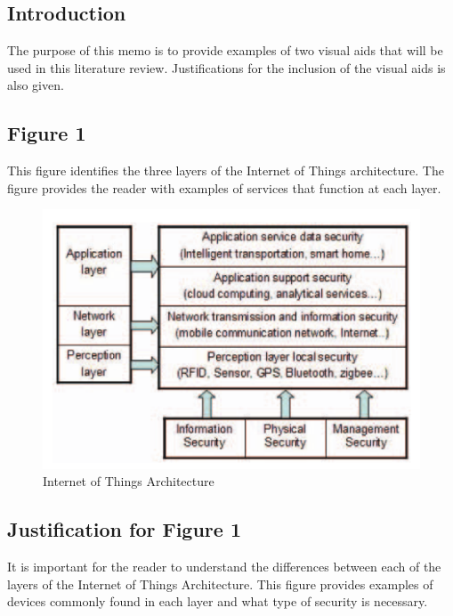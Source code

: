 \documentclass[letterpaper, 12pt]{texMemo}
\begin{document}
\maketitle
\begin{flushleft}
\subsection*{Introduction}
The purpose of this memo is to provide examples of two visual aids that will be used in this literature review. Justifications for the inclusion of the visual aids is also given.

\subsection*{Figure 1}
This figure identifies the three layers of the Internet of Things architecture. The figure provides the reader with examples of services that function at each layer.


\begin{figure}[h!]
	\includegraphics[width=\linewidth]{figure2.png}
	\caption{Internet of Things Architecture}
	\label{fig:arch}
\end{figure}

\subsection*{Justification for Figure 1}
It is important for the reader to understand the differences between each of the layers of the Internet of Things Architecture. 
This figure provides examples of devices commonly found in each layer and what type of security is necessary. 


\end{flushleft}
\end{document}
